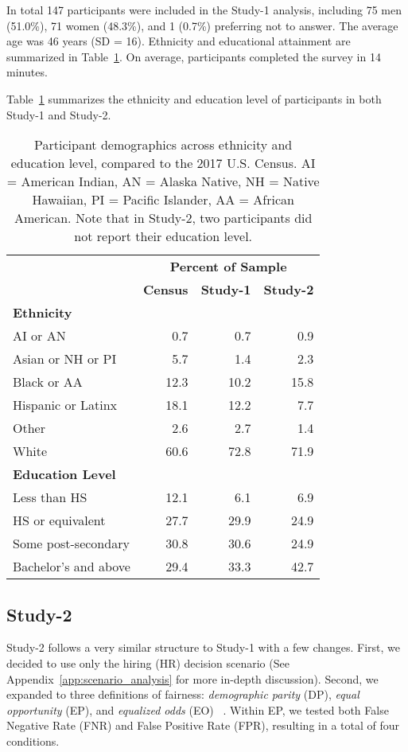 \documentclass{article}
\newcommand{\studyA}{Study-1}
\newcommand{\studyB}{Study-2}
\newcommand{\dsnew}[1]{{\color{magenta}{DS: #1}}}
\newcommand{\dsnew}[1]{#1}
\newcommand{\Appref}[1]{Appendix~\ref{#1}}
\begin{document}
\dsnew{Data was collected during August 2019.} In total 147 participants were included in the \studyA{} analysis, including 75 men (51.0\%), 71 women (48.3\%), and 1 (0.7\%) preferring not to answer. The average age was 46 years (SD = 16). Ethnicity and educational attainment are summarized in Table~\ref{tab:demo}. On average, participants completed the survey in 14 minutes.

Table~\ref{tab:demo} summarizes the ethnicity and education level of participants in both \studyA{} and \studyB{}.

\begin{table}[ht]
\centering
\caption{\label{tab:demo} Participant demographics across ethnicity and education level, compared to the 2017 U.S. Census. AI = American Indian, AN = Alaska Native, NH = Native Hawaiian, PI = Pacific Islander, AA = African American. Note that in \studyB{}, two participants did not report their education level.}
\vspace{5pt}
{\small
\begin{tabular}{@{}lrrr@{}}
    \toprule
    & \multicolumn{3}{c}{\textbf{Percent of Sample}} \\
    & \textbf{Census} & \textbf{\studyA{}} & \textbf{\studyB{}} \\
    \midrule
    \textbf{Ethnicity} & & \\
    AI or AN & 0.7 & 0.7 & 0.9\\
    Asian or NH or PI & 5.7 & 1.4 & 2.3 \\
    Black or AA & 12.3 & 10.2 & 15.8 \\
    Hispanic or Latinx & 18.1 & 12.2 & 7.7\\
    Other & 2.6 & 2.7 & 1.4 \\
    White & 60.6 & 72.8 & 71.9 \\
    
  \addlinespace[1.5 ex]
    \textbf{Education Level} & & \\
    Less than HS & 12.1 & 6.1 & 6.9 \\
    HS or equivalent & 27.7 & 29.9 & 24.9 \\
    Some post-secondary & 30.8 & 30.6 & 24.9 \\
    Bachelor's and above & 29.4 & 33.3 & 42.7 \\
    \bottomrule
\end{tabular}}
\vspace{-5pt}
\end{table} 




\subsection{\studyB}\label{sec:studyB}
\studyB{} follows a very similar structure to \studyA{} with a few changes. First, we decided to use only the hiring (HR) decision scenario (See \Appref{app:scenario_analysis} for more in-depth discussion). Second, we expanded to three definitions of fairness: \emph{demographic parity} (DP), \emph{equal opportunity} (EP), and \emph{equalized odds} (EO) ~\cite{Hardt16:Equality}. Within EP, we tested both False Negative Rate (FNR) and False Positive Rate (FPR), resulting in a total of four conditions. 
\end{document}
